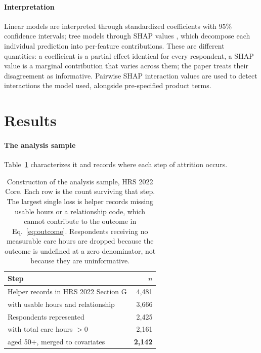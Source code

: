 \documentclass[9pt,twoside]{pnas-new}
\begin{document}
\paragraph{Interpretation} Linear models are interpreted through standardized
coefficients with 95\% confidence intervals; tree models through SHAP values \cite{lundberg2017},
which decompose each individual prediction into per-feature contributions.
These are different quantities: a coefficient is a partial effect identical for
every respondent, a SHAP value is a marginal contribution that varies across
them; the paper treats their disagreement as informative. Pairwise SHAP interaction values are used to detect interactions the
model used, alongside pre-specified product terms.

\section*{Results}

\paragraph{The analysis sample} Table~\ref{tab:sample} characterizes it and
records where each step of attrition occurs.

\begin{table}[!ht]
\centering
\caption{Construction of the analysis sample, HRS 2022 Core. Each row is the
count surviving that step. The largest single loss is helper records missing
usable hours or a relationship code, which cannot contribute to the outcome in
Eq.~\ref{eq:outcome}. Respondents receiving no measurable care hours are dropped
because the outcome is undefined at a zero denominator, not because they are
uninformative.}
\label{tab:sample}
\begin{tabular}{lr}
\toprule
Step & $n$ \\
\midrule
Helper records in HRS 2022 Section G & 4{,}481 \\
\quad with usable hours and relationship & 3{,}666 \\
Respondents represented & 2{,}425 \\
\quad with total care hours $> 0$ & 2{,}161 \\
\quad aged 50+, merged to covariates & \textbf{2{,}142} \\
\bottomrule
\end{tabular}

\end{table}
\end{document}
